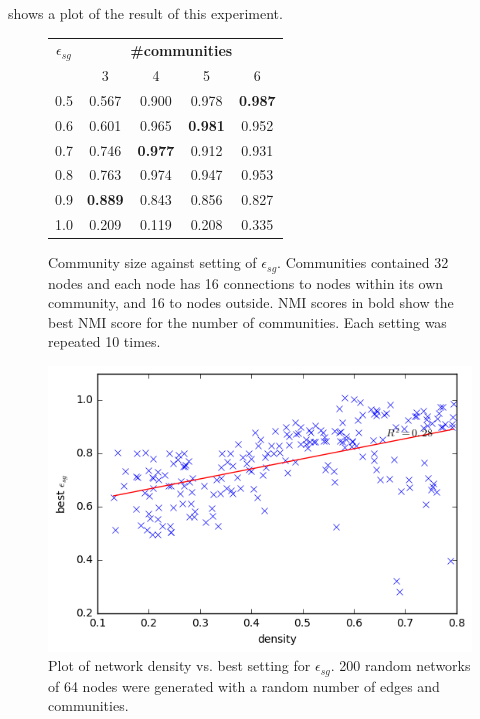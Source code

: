 \documentclass{report}
\begin{document}
	 shows a plot of the result of this experiment. 
	
	\begin{figure}
		\centering
		\begin{tabular}{c c c c c}
			\toprule
			$\epsilon_{sg}$ & \multicolumn{4}{c}{\textbf{\#communities}} \\
			{} & 3 & 4 & 5 & 6 \\
			\bottomrule
			0.5 & 0.567 & 0.900 & 0.978 & \textbf{0.987} \\
			0.6 & 0.601 & 0.965 & \textbf{0.981} & 0.952 \\
			0.7 & 0.746 & \textbf{0.977} & 0.912 & 0.931 \\
			0.8 & 0.763 & 0.974 & 0.947 & 0.953 \\
			0.9 & \textbf{0.889} & 0.843 & 0.856 & 0.827 \\
			1.0 & 0.209 & 0.119 & 0.208 & 0.335 \\
			\bottomrule
		\end{tabular}
		\caption{Community size against setting of $\epsilon_{sg}$. Communities contained 32 nodes and each node has 16 connections to nodes within its own community, and 16 to nodes outside. NMI scores in bold show the best NMI score for the number of communities. Each setting was repeated 10 times. }
		\label{parameter_experiment}
	\end{figure}
	
	\begin{figure}
		\centering
		\includegraphics[width=\textwidth]{../derived_results.png}
		\caption{Plot of network density vs. best setting for $\epsilon_{sg}$. 200 random networks of 64 nodes were generated with a random number of edges and communities.}
		\label{density}
	\end{figure}
	
\end{document}
